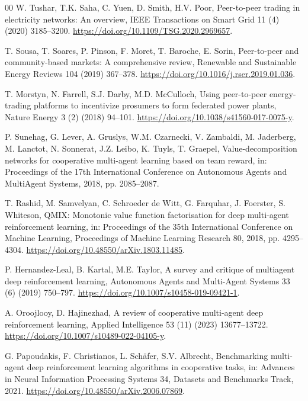 \documentclass[final,5p,times]{elsarticle}
\begin{document}
\begin{thebibliography}{00}
W. Tushar, T.K. Saha, C. Yuen, D. Smith, H.V. Poor, Peer-to-peer trading in electricity networks: An overview, IEEE Transactions on Smart Grid 11 (4) (2020) 3185--3200. \url{https://doi.org/10.1109/TSG.2020.2969657}.

T. Sousa, T. Soares, P. Pinson, F. Moret, T. Baroche, E. Sorin, Peer-to-peer and community-based markets: A comprehensive review, Renewable and Sustainable Energy Reviews 104 (2019) 367--378. \url{https://doi.org/10.1016/j.rser.2019.01.036}.

T. Morstyn, N. Farrell, S.J. Darby, M.D. McCulloch, Using peer-to-peer energy-trading platforms to incentivize prosumers to form federated power plants, Nature Energy 3 (2) (2018) 94--101. \url{https://doi.org/10.1038/s41560-017-0075-y}.

P. Sunehag, G. Lever, A. Gruslys, W.M. Czarnecki, V. Zambaldi, M. Jaderberg, M. Lanctot, N. Sonnerat, J.Z. Leibo, K. Tuyls, T. Graepel, Value-decomposition networks for cooperative multi-agent learning based on team reward, in: Proceedings of the 17th International Conference on Autonomous Agents and MultiAgent Systems, 2018, pp. 2085--2087.

T. Rashid, M. Samvelyan, C. Schroeder de Witt, G. Farquhar, J. Foerster, S. Whiteson, QMIX: Monotonic value function factorisation for deep multi-agent reinforcement learning, in: Proceedings of the 35th International Conference on Machine Learning, Proceedings of Machine Learning Research 80, 2018, pp. 4295--4304. \url{https://doi.org/10.48550/arXiv.1803.11485}.

P. Hernandez-Leal, B. Kartal, M.E. Taylor, A survey and critique of multiagent deep reinforcement learning, Autonomous Agents and Multi-Agent Systems 33 (6) (2019) 750--797. \url{https://doi.org/10.1007/s10458-019-09421-1}.

A. Oroojlooy, D. Hajinezhad, A review of cooperative multi-agent deep reinforcement learning, Applied Intelligence 53 (11) (2023) 13677--13722. \url{https://doi.org/10.1007/s10489-022-04105-y}.

G. Papoudakis, F. Christianos, L. Sch\"afer, S.V. Albrecht, Benchmarking multi-agent deep reinforcement learning algorithms in cooperative tasks, in: Advances in Neural Information Processing Systems 34, Datasets and Benchmarks Track, 2021. \url{https://doi.org/10.48550/arXiv.2006.07869}.


\end{thebibliography}
\end{document}
